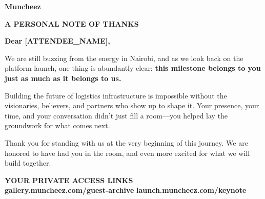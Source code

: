 \documentclass[11pt,a4paper]{article}
\begin{document}
\begin{center}

{\fontsize{32}{38}\sffamily\bfseries\color{CorporateNavy} Muncheez}

\vspace{0.2cm}
\textsf{\scriptsize\bfseries\color{LinkBlue}\uppercase{A Personal Note of Thanks}}

\vspace{0.8cm}


\vspace{1.0cm}

{\fontsize{22}{28}\sffamily\bfseries\color{CorporateNavy} Dear [ATTENDEE\_NAME],}

\vspace{0.8cm}

\begin{minipage}{0.88\textwidth}
    \centering
    \textsf{\small\color{DeepCharcoal} We are still buzzing from the energy in Nairobi, and as we look back on the platform launch, one thing is abundantly clear: \textbf{this milestone belongs to you just as much as it belongs to us.}}

    \vspace{0.5cm}
    \textsf{\small\color{DeepCharcoal} Building the future of logistics infrastructure is impossible without the visionaries, believers, and partners who show up to shape it. Your presence, your time, and your conversation didn't just fill a room—you helped lay the groundwork for what comes next.}

    \vspace{0.5cm}
    \textsf{\small\color{DeepCharcoal} Thank you for standing with us at the very beginning of this journey. We are honored to have had you in the room, and even more excited for what we will build together.}
\end{minipage}

\vspace{1.2cm}

\textsf{\scriptsize\bfseries\color{CorporateNavy}\uppercase{Your Private Access Links}} \\[0.2cm]
\textsf{\small\bfseries\color{LinkBlue} gallery.muncheez.com/guest-archive} \hspace{0.3cm}\textperiodcentered\hspace{0.3cm} \textsf{\small\bfseries\color{LinkBlue} launch.muncheez.com/keynote}


\end{center}
\end{document}
